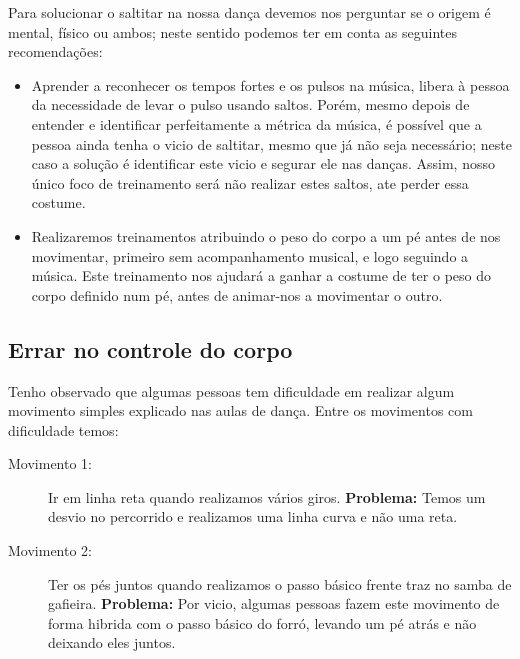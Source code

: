 \begin{SolutionT}
Para solucionar o saltitar na nossa dança devemos nos perguntar se o origem é mental, físico ou ambos;
neste sentido podemos ter em conta as seguintes recomendações:
\begin{itemize}
\item  Aprender a reconhecer os tempos fortes e os pulsos na música, 
libera à pessoa da necessidade de levar o pulso usando saltos.
Porém, mesmo depois de entender e identificar perfeitamente a métrica da música,
é possível que a pessoa ainda tenha o vicio de saltitar, mesmo que já não seja necessário;
neste caso a solução é identificar este vicio e segurar ele nas danças. Assim, 
nosso único foco de treinamento será não realizar estes saltos, ate perder essa costume.
\item  Realizaremos treinamentos atribuindo o peso do corpo a um pé 
antes de nos movimentar, primeiro sem acompanhamento musical,
e logo seguindo a música.
Este treinamento nos ajudará a ganhar a costume de ter o peso do corpo definido num pé,
antes de animar-nos a movimentar o outro. 
\end{itemize}
\end{SolutionT}




\subsection{Errar no controle do corpo}



Tenho observado que algumas pessoas tem dificuldade
em realizar algum movimento simples explicado nas aulas de dança.
Entre os movimentos com dificuldade temos:
\begin{description}
\item[Movimento 1:] Ir em linha reta quando realizamos vários giros.
\textbf{Problema:} Temos um desvio no percorrido e realizamos uma linha curva e não uma reta.
\item[Movimento 2:] Ter os pés juntos quando realizamos o passo básico frente traz no samba de gafieira.
\textbf{Problema:} Por vicio, algumas pessoas fazem este movimento de forma hibrida com o passo básico do forró,
levando um pé atrás e não deixando eles juntos.\\
\end{description} 


